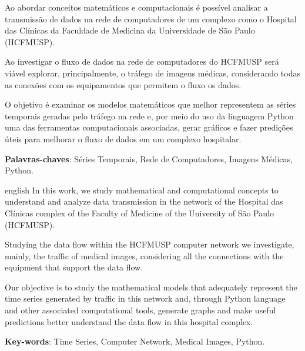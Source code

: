 \documentclass[
	12pt,				%
	openright,			%
	twoside,			%
	a4paper,			%
	english,			%
	french,				%
	spanish,			%
	brazil				%
	]{abntex2}
\begin{document}
\setlength{\absparsep}{18pt} %
\begin{resumo}
Ao abordar conceitos matemáticos e computacionais é possível analisar a transmissão de dados na rede de computadores de um complexo como o Hospital das Clínicas da Faculdade
de Medicina da Universidade de São Paulo (HCFMUSP).

Ao investigar o fluxo de dados na rede de computadores do HCFMUSP será viável explorar, principalmente, o tráfego de imagens médicas, considerando todas as conexões com os equipamentos que permitem o fluxo os dados.

O objetivo é examinar os modelos matemáticos que melhor representem as séries temporais geradas pelo tráfego na rede e, por meio do uso da linguagem Python uma das ferramentas computacionais associadas, gerar gráficos e fazer predições úteis para melhorar o fluxo de dados em um complexo hospitalar.

\textbf{Palavras-chaves}: Séries Temporais, Rede de Computadores, Imagens Médicas, Python.
\end{resumo}

\begin{resumo}[Abstract]
 \begin{otherlanguage*}{english}
In this work, we study mathematical and computational concepts to understand and analyze data transmission in the network of the Hospital das Clínicas complex of the Faculty of Medicine of the University of São Paulo (HCFMUSP).

Studying the data flow within the HCFMUSP computer network we investigate, mainly, the traffic of medical images, considering all the connections with the equipment that support the data flow.

Our objective is to study the mathematical models that adequately represent the time series generated by traffic in this network and, through Python language and other associated computational tools, generate graphs and make useful predictions better understand the data flow in this hospital complex.

   \vspace{\onelineskip}
 
   \noindent 
   \textbf{Key-words}: Time Series, Computer Network, Medical Images, Python.
 \end{otherlanguage*}
\end{resumo}

\end{document}
